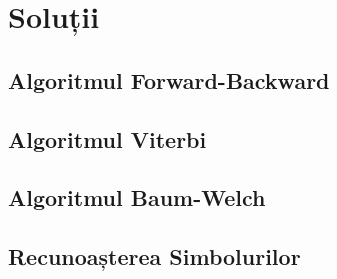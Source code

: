 \documentclass{article}
\begin{document}
\section{Soluții}
\label{sec:solutions}

\subsection{Algoritmul Forward-Backward}
\label{sec:fb-sol}

\subsection{Algoritmul Viterbi}
\label{sec:viterbi-sol}

\subsection{Algoritmul Baum-Welch}
\label{sec:baum-welch-sol}

\subsection{Recunoașterea Simbolurilor}
\label{sec:symbol-recognition-sol}
\end{document}
